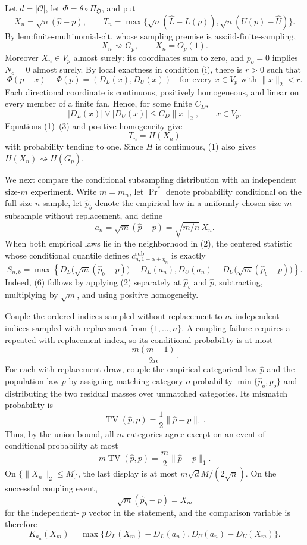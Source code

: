 Let \(d=|\mathcal O|\), let \(\Phi=\theta\circ\Pi_{\mathfrak O}\), and put
\[
X_n=\sqrt n(\widehat p-p),\qquad
T_n=\max\{\sqrt n(\widehat L-L(p)),\sqrt n(U(p)-\widehat U)\}.
\]
By \(\text{lem:finite-multinomial-clt}\), whose sampling premise is \(\text{ass:iid-finite-sampling}\),
\[
X_n\rightsquigarrow G_p,
\qquad X_n=O_p(1).
\tag{1}
\]
Moreover \(X_n\in V_p\) almost surely: its coordinates sum to zero, and \(p_o=0\) implies \(N_o=0\) almost surely.  By local exactness in condition (i), there is \(r>0\) such that
\[
\Phi(p+x)-\Phi(p)=(D_L(x),D_U(x))
\quad\text{for every }x\in V_p\text{ with }\|x\|_2<r.
\tag{2}
\]
Each directional coordinate is continuous, positively homogeneous, and linear on every member of a finite fan.  Hence, for some finite \(C_D\),
\[
|D_L(x)|\vee|D_U(x)|\leq C_D\|x\|_2,
\qquad x\in V_p.
\tag{3}
\]
Equations (1)--(3) and positive homogeneity give
\[
T_n=H(X_n)
\tag{4}
\]
with probability tending to one.  Since \(H\) is continuous, (1) also gives \(H(X_n)\rightsquigarrow H(G_p)\).

We next compare the conditional subsampling distribution with an independent size-\(m\) experiment.  Write \(m=m_n\), let \(\Pr^*\) denote probability conditional on the full size-\(n\) sample, let \(\widehat p_b\) denote the empirical law in a uniformly chosen size-\(m\) subsample without replacement, and define
\[
a_n=\sqrt m(\widehat p-p)=\sqrt{m/n}\,X_n.
\tag{5}
\]
When both empirical laws lie in the neighborhood in (2), the centered statistic whose conditional quantile defines \(c^{\mathrm{sub}}_{n,1-\alpha+\eta_n}\) is exactly
\[
S_{n,b}=\max\left\{
D_L\bigl(\sqrt m(\widehat p_b-p)\bigr)-D_L(a_n),
D_U(a_n)-D_U\bigl(\sqrt m(\widehat p_b-p)\bigr)
\right\}.
\tag{6}
\]
Indeed, (6) follows by applying (2) separately at \(\widehat p_b\) and \(\widehat p\), subtracting, multiplying by \(\sqrt m\), and using positive homogeneity.

Couple the ordered indices sampled without replacement to \(m\) independent indices sampled with replacement from \(\{1,\ldots,n\}\).  A coupling failure requires a repeated with-replacement index, so its conditional probability is at most
\[
\frac{m(m-1)}{2n}.
\tag{7}
\]
For each with-replacement draw, couple the empirical categorical law \(\widehat p\) and the population law \(p\) by assigning matching category \(o\) probability \(\min\{\widehat p_o,p_o\}\) and distributing the two residual masses over unmatched categories.  Its mismatch probability is
\[
\operatorname{TV}(\widehat p,p)
=\frac12\|\widehat p-p\|_1.
\]
Thus, by the union bound, all \(m\) categories agree except on an event of conditional probability at most
\[
m\operatorname{TV}(\widehat p,p)
=\frac m2\|\widehat p-p\|_1.
\tag{8}
\]
On \(\{\|X_n\|_2\leq M\}\), the last display is at most \(m\sqrt d M/(2\sqrt n)\).  On the successful coupling event,
\[
\sqrt m(\widehat p_b-p)=X_m
\]
for the independent-
\(p\) vector in the statement, and the comparison variable is therefore
\[
K_{a_n}(X_m)
=\max\{D_L(X_m)-D_L(a_n),D_U(a_n)-D_U(X_m)\}.
\tag{9}
\]

